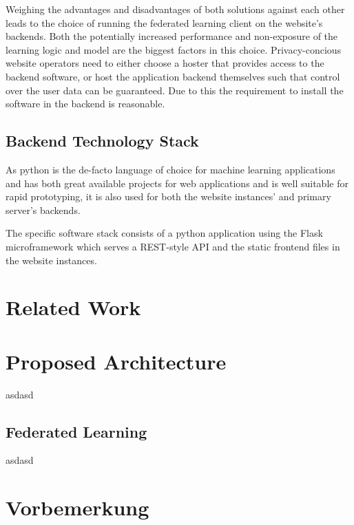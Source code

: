 \documentclass[
    fontsize=12pt,
    headings=small,
    parskip=half,           %
    bibliography=totoc,
    numbers=noenddot,       %
    open=any,               %
    ]{scrreprt}
\begin{document}
Weighing the advantages and disadvantages of both solutions against each other leads to the choice of running the federated learning client on the website's backends. Both the potentially increased performance and non-exposure of the learning logic and model are the biggest factors in this choice. Privacy-concious website operators need to either choose a hoster that provides access to the backend software, or host the application backend themselves such that control over the user data can be guaranteed. Due to this the requirement to install the software in the backend is reasonable.

\section{Backend Technology Stack}

As python is the de-facto language of choice for machine learning applications and has both great available projects for web applications and is well suitable for rapid prototyping, it is also used for both the website instances' and primary server's backends.

The specific software stack consists of a python application using the Flask microframework which serves a REST-style API and the static frontend files in the website instances.


\chapter{Related Work}



\chapter{Proposed Architecture}

asdasd

\section{Federated Learning}

asdasd











\chapter{Vorbemerkung}
\end{document}
